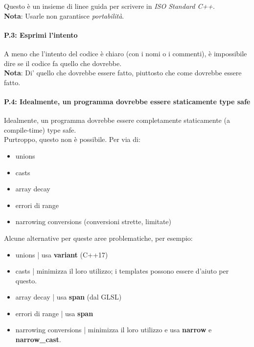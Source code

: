 \textsf{\small Questo è un insieme di linee guida per scrivere in \emph{ISO Standard C++}.} \\

\textsf{\small \textbf{Nota}: Usarle non garantisce \emph{portabilità}.} \\

\paragraph{P.3: Esprimi l'intento}

\textsf{\small A meno che l'intento del codice è chiaro (con i nomi o i commenti), è impossibile dire se il codice fa quello che dovrebbe.} \\

\textsf{\small \textbf{Nota}: Di' quello che dovrebbe essere fatto, piuttosto che come dovrebbe essere fatto.} \\

\paragraph{P.4: Idealmente, un programma dovrebbe essere staticamente type safe}

\textsf{\small Idealmente, un programma dovrebbe essere completamente staticamente (a compile-time) type safe.} \\

\textsf{\small Purtroppo, questo non è possibile. Per via di: } 

\begin{multicols}{2}
	\begin{itemize}
		\item \textsf{\small unions}
		\item \textsf{\small casts}
		\item \textsf{\small array decay}
		\item \textsf{\small errori di range}
		\item \textsf{\small narrowing conversions (conversioni strette, limitate)}
	\end{itemize}
\end{multicols}

\textsf{\small Alcune alternative per queste aree problematiche, per esempio: } \\

\begin{multicols}{2}
	\begin{itemize}
		\item \textsf{\small unions | usa \textbf{variant} (C++17)}
		\item \textsf{\small casts | minimizza il loro utilizzo; i templates possono essere d'aiuto per questo.}
		\item \textsf{\small array decay | usa \textbf{span} (dal GLSL)}
		\item \textsf{\small errori di range | usa \textbf{span}}
		\item \textsf{\small narrowing conversions | minimizza il loro utilizzo e usa \textbf{narrow} e \textbf{narrow\_cast}.}
	\end{itemize}
\end{multicols}

